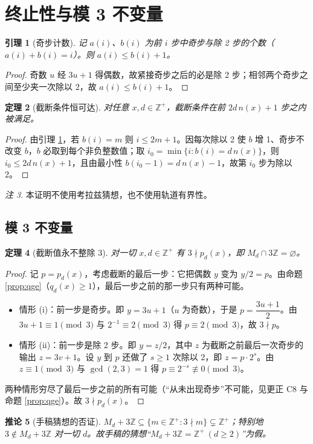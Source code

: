 \documentclass[11pt]{article}
\newtheorem{theorem}{定理}[section]
\newtheorem{lemma}[theorem]{引理}
\newtheorem{corollary}[theorem]{推论}
\theoremstyle{definition}\newtheorem{definition}[theorem]{定义}
\theoremstyle{definition}\newtheorem{conjecture}[theorem]{猜想}
\theoremstyle{remark}\newtheorem{remark}[theorem]{注}
\begin{document}
\section{终止性与模 3 不变量}
\begin{lemma}[奇步计数]\label{lem:ab}
记 $a(i)$、$b(i)$ 为前 $i$ 步中奇步与除 2 步的个数（$a(i)+b(i)=i$）。则 $a(i)\le b(i)+1$。
\end{lemma}
\begin{proof}
奇数 $u$ 经 $3u+1$ 得偶数，故紧接奇步之后的必是除 2 步；相邻两个奇步之间至少夹一次除以 2，故 $a(i)\le b(i)+1$。
\end{proof}
\begin{theorem}[截断条件恒可达]\label{thm:term}
对任意 $x,d\in\mathbb{Z}^+$，截断条件在前 $2d\,n(x)+1$ 步之内被满足。
\end{theorem}
\begin{proof}
由引理 \ref{lem:ab}，若 $b(i)=m$ 则 $i\le2m+1$。因每次除以 2 使 $b$ 增 1、奇步不改变 $b$，$b$ 必取到每个非负整数值；取 $i_0=\min\{i:b(i)=d\,n(x)\}$，则 $i_0\le2d\,n(x)+1$，且由最小性 $b(i_0-1)=d\,n(x)-1$，故第 $i_0$ 步为除以 2。
\end{proof}
\begin{remark}\label{rem:noconj}
本证明不使用考拉兹猜想，也不使用轨道有界性。
\end{remark}
\subsection{模 3 不变量}
\begin{theorem}[截断值永不整除 3]\label{thm:mod3}
对一切 $x,d\in\mathbb{Z}^+$ 有 $3\nmid p_d(x)$，即 $M_d\cap3\mathbb{Z}=\varnothing$。
\end{theorem}
\begin{proof}
记 $p=p_d(x)$，考虑截断的最后一步：它把偶数 $y$ 变为 $y/2=p$。由命题 \ref{prop:qge}（$q_d(x)\ge1$），最后一步之前的那一步只有两种可能。
\begin{itemize}\item 情形 (i)：前一步是奇步。即 $y=3u+1$（$u$ 为奇数），于是 $p=\dfrac{3u+1}{2}$。由 $3u+1\equiv1\pmod3$ 与 $2^{-1}\equiv2\pmod3$ 得 $p\equiv2\pmod3$，故 $3\nmid p$。\item 情形 (ii)：前一步是除 2 步。即 $y=z/2$，其中 $z$ 为截断之前最后一次奇步的输出 $z=3v+1$。设 $y$ 到 $p$ 还做了 $s\ge1$ 次除以 2，即 $z=p\cdot2^{s}$。由 $z\equiv1\pmod3$ 与 $\gcd(2,3)=1$ 得 $p\equiv2^{-s}\not\equiv0\pmod3$。\end{itemize}
两种情形穷尽了最后一步之前的所有可能（“从未出现奇步”不可能，见更正 C8 与命题 \ref{prop:qge}）。故 $3\nmid p_d(x)$。
\end{proof}
\begin{corollary}[手稿猜想的否证]\label{cor:subset}
$M_d+3\mathbb{Z}\subseteq\{m\in\mathbb{Z}^+:3\nmid m\}\subsetneq\mathbb{Z}^+$；特别地 $3\notin M_d+3\mathbb{Z}$ 对一切 $d$。故手稿的猜想“$M_d+3\mathbb{Z}=\mathbb{Z}^+\ (d\ge2)$”为假。
\end{corollary}
\end{document}
